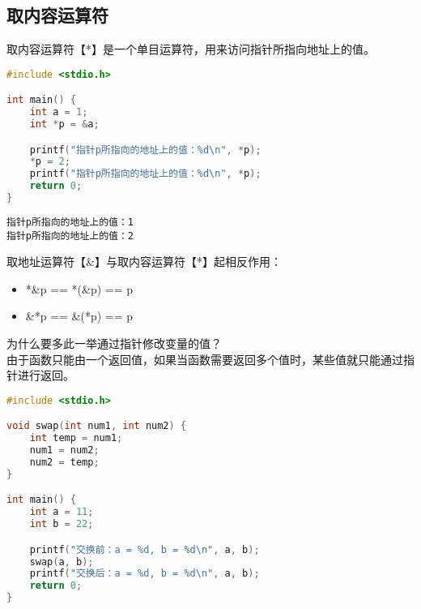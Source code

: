 \vspace{0.5cm}

\subsection{取内容运算符}

取内容运算符【*】是一个单目运算符，用来访问指针所指向地址上的值。\\


\begin{lstlisting}[language=C]
#include <stdio.h>

int main() {
    int a = 1;
    int *p = &a;

    printf("指针p所指向的地址上的值：%d\n", *p);
    *p = 2;
    printf("指针p所指向的地址上的值：%d\n", *p);
    return 0;
}
\end{lstlisting}

\begin{tcolorbox}
	\begin{verbatim}
指针p所指向的地址上的值：1
指针p所指向的地址上的值：2
	\end{verbatim}
\end{tcolorbox}

取地址运算符【\&】与取内容运算符【*】起相反作用：

\begin{itemize}
	\item *\&p == *(\&p) == p
	\item \&*p == \&(*p) == p
\end{itemize}

为什么要多此一举通过指针修改变量的值？\\

由于函数只能由一个返回值，如果当函数需要返回多个值时，某些值就只能通过指针进行返回。\\


\begin{lstlisting}[language=C]
#include <stdio.h>

void swap(int num1, int num2) {
    int temp = num1;
    num1 = num2;
    num2 = temp;
}

int main() {
    int a = 11;
    int b = 22;

    printf("交换前：a = %d, b = %d\n", a, b);
    swap(a, b);
    printf("交换后：a = %d, b = %d\n", a, b);
    return 0;
}
\end{lstlisting}

